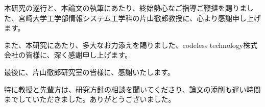 \acknowledgment
本研究の遂行と、本論文の執筆にあたり、終始熱心なご指導ご鞭撻を賜りました、宮崎大学工学部情報システム工学科の片山徹郎教授に、心より感謝申し上げます。

また、本研究にあたり、多大なお力添えを賜りました、codeless technology株式会社の皆様に、深く感謝申し上げます。

最後に、片山徹郎研究室の皆様に、感謝いたします。

特に教授と先輩方は、研究方針の相談を聞いてくださり、論文の添削も遅い時間までしていただきました。ありがとうございました。